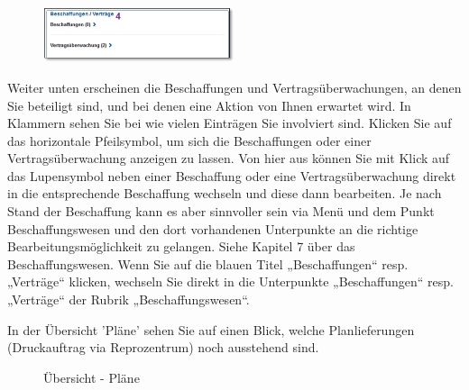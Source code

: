 \vspace{\baselineskip}


\begin{figure}
  \vspace{-20pt}
  \begin{center}
    \includegraphics[width=0.5\textwidth]{../chapters/01_Einfuehrung/pictures/1-3-2_persUebersichtBeschaffung.jpg}
  \end{center}
  \vspace{-20pt}
  \vspace{-10pt}
\end{figure}
Weiter unten erscheinen die Beschaffungen  und Vertragsüberwachungen, an denen Sie beteiligt sind, und bei denen eine Aktion von Ihnen erwartet wird. In Klammern sehen Sie bei wie vielen Einträgen Sie involviert sind. Klicken Sie auf das horizontale Pfeilsymbol, um sich die Beschaffungen oder einer Vertragsüberwachung anzeigen zu lassen. Von hier aus können Sie mit Klick auf das Lupensymbol neben einer Beschaffung oder eine Vertragsüberwachung direkt in die entsprechende Beschaffung wechseln und diese dann bearbeiten. Je nach Stand der Beschaffung kann es aber sinnvoller sein via Menü und dem Punkt Beschaffungswesen und den dort vorhandenen Unterpunkte an die richtige Bearbeitungsmöglichkeit zu gelangen. Siehe Kapitel 7 über das Beschaffungswesen. Wenn Sie auf die blauen Titel „Beschaffungen“ resp. „Verträge“  klicken, wechseln Sie direkt in die Unterpunkte „Beschaffungen“ resp. „Verträge“ der Rubrik „Beschaffungswesen“.

\pagebreak

In der Übersicht 'Pläne'  sehen Sie auf einen Blick, welche Planlieferungen (Druckauftrag via Reprozentrum) noch ausstehend sind. 

\begin{figure}[H] %
\caption{Übersicht - Pläne}
\end{figure}

